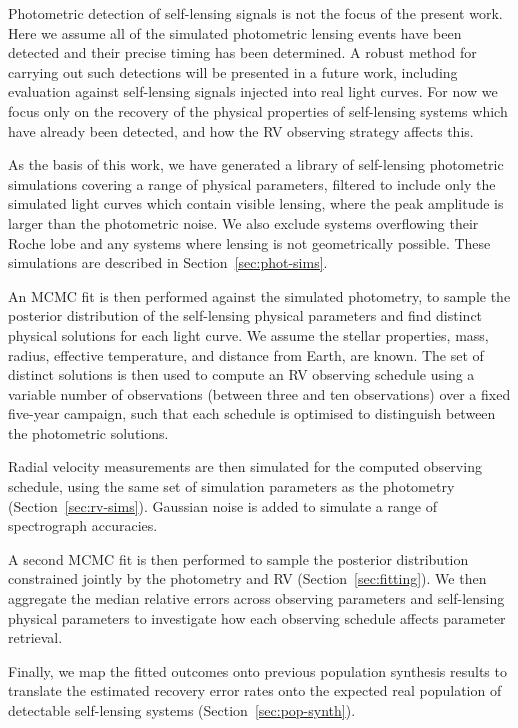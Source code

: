 \documentclass[fleqn,usenatbib]{mnras}
\begin{document}
Photometric detection of self-lensing signals is not the focus of the present work. Here we assume all of the simulated photometric lensing events have been detected and their precise timing has been determined. A robust method for carrying out such detections will be presented in a future work, including evaluation against self-lensing signals injected into real light curves. For now we focus only on the recovery of the physical properties of self-lensing systems which have already been detected, and how the RV observing strategy affects this.

As the basis of this work, we have generated a library of self-lensing photometric simulations covering a range of physical parameters, filtered to include only the simulated light curves which contain visible lensing, where the peak amplitude is larger than the photometric noise. We also exclude systems overflowing their Roche lobe and any systems where lensing is not geometrically possible. These simulations are described in Section~\ref{sec:phot-sims}.

An MCMC fit is then performed against the simulated photometry, to sample the posterior distribution of the self-lensing physical parameters and find distinct physical solutions for each light curve. We assume the stellar properties, mass, radius, effective temperature, and distance from Earth, are known. The set of distinct solutions is then used to compute an RV observing schedule using a variable number of observations (between three and ten observations) over a fixed five-year campaign, such that each schedule is optimised to distinguish between the photometric solutions.

Radial velocity measurements are then simulated for the computed observing schedule, using the same set of simulation parameters as the photometry (Section~\ref{sec:rv-sims}). Gaussian noise is added to simulate a range of spectrograph accuracies.

A second MCMC fit is then performed to sample the posterior distribution constrained jointly by the photometry and RV (Section~\ref{sec:fitting}). We then aggregate the median relative errors across observing parameters and self-lensing physical parameters to investigate how each observing schedule affects parameter retrieval.

Finally, we map the fitted outcomes onto previous population synthesis results to translate the estimated recovery error rates onto the expected real population of detectable self-lensing systems (Section~\ref{sec:pop-synth}).
\end{document}
